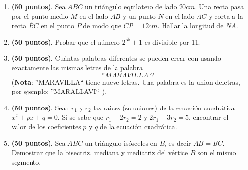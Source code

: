 \begin{enumerate}
	\item \textbf{(50 puntos)}. Sea $ABC$ un triángulo equilatero de lado $20cm$. Una recta pasa por el punto medio $M$ en el lado $AB$ y un punto $N$ en el lado $AC$ y corta a la recta $\overleftrightarrow{BC}$ en el punto $P$ de modo que $CP=12cm$. Hallar la longitud de $NA$.
	

	\item \textbf{(50 puntos)}. Probar que el número $2^{55}+1$ es divisible por 11.
	

	\item \textbf{(50 puntos)}.  Cuántas palabras diferentes se pueden crear con usando exactamente las mismas letras de la palabra \[\textit{''MARAVILLA``}?\] (\textbf{Nota}: ''MARAVILLA`` tiene nueve letras. Una palabra es la union deletras, por ejemplo: ''MARALLAVI``. ).

	\item \textbf{(50 puntos)}. Sean $r_1$ y $r_2$ las raices (soluciones) de la ecuación cuadrática $x^2+px+q=0$. Si se sabe que $r_1 - 2r_2=2$ y $2r_1 -3r_2=5$, encontrar el valor de los coeficientes $p$ y $q$ de la ecuación cuadrática.

	\item \textbf{(50 puntos)}. Sea $ABC$ un triángulo isósceles en $B$, es decir $AB=BC$. Demostrar que la bisectriz, mediana y mediatriz del vértice $B$ son el mismo segmento.

\end{enumerate}